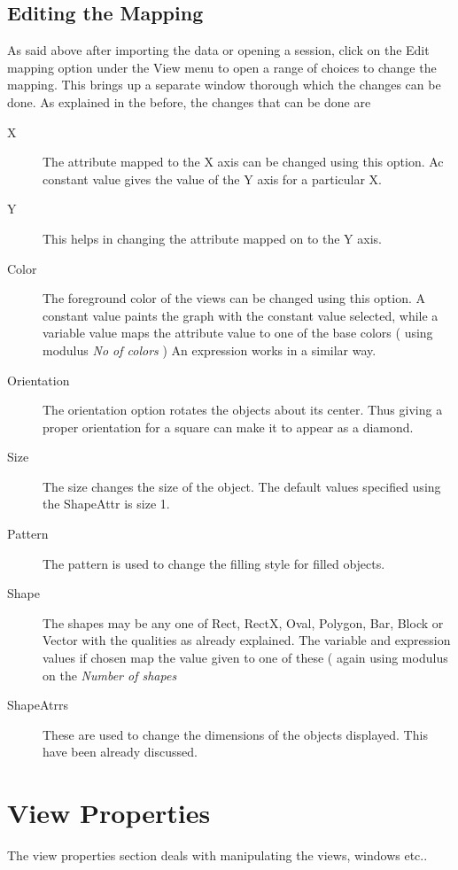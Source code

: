 \subsection{Editing the Mapping}

As said above after importing the data or opening a session, click on the Edit mapping option under the View menu to open a range of choices to change the mapping. This brings up a separate window thorough which the changes can be done. As explained in the before, the changes that can be done are

\begin{description}
\item[X] The attribute mapped to the X axis can be changed using this option. Ac constant value gives the value of the Y axis for a particular X. 
\item[Y] This helps in changing the attribute mapped on to the Y axis.
\item[Color] The foreground color of the views can be changed using this option. A constant value paints the graph with the constant value selected, while a variable value maps the attribute value to one of the base colors ( using modulus  {\em No of colors } ) An expression works in a similar way.
\item[Orientation] The orientation option rotates the objects about its center. Thus giving a proper orientation for a square can  make it to appear as a  diamond.
\item[Size] The size changes the size of the object. The default values specified using the ShapeAttr is size 1.
\item[Pattern] The pattern is used to change the filling style for filled objects.
\item[Shape] The shapes may be any one of Rect, RectX, Oval, Polygon, Bar, Block or Vector with the qualities as already explained. The variable and expression values if chosen map the value given to one of these ( again using modulus on the {\em Number of shapes } 
\item[ShapeAtrrs] These are used to change the dimensions of the objects displayed. This have been already discussed. 
\end{description}

\section{View Properties}

The view properties section deals with manipulating the views, windows etc..

